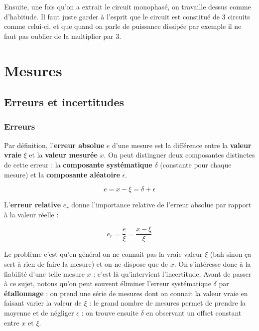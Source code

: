 Ensuite, une fois qu'on a extrait le circuit monophasé, on travaille dessus comme d'habitude. Il faut juste garder à l'esprit que le circuit est constitué de 3 circuits comme celui-ci, et que quand on parle de puissance dissipée par exemple il ne faut pas oublier de la multiplier par 3.


\section{Mesures}
\subsection{Erreurs et incertitudes}
\subsubsection*{Erreurs}
Par définition, l'\textbf{erreur absolue} $e$ d'une mesure est la différence entre la \textbf{valeur vraie} $\xi$ et la \textbf{valeur mesurée} $x$. On peut distinguer deux composantes distinctes de cette erreur : la \textbf{composante systématique} $\delta$ (constante pour chaque mesure) et la \textbf{composante aléatoire} $\epsilon$.

\begin{equation}
e = x - \xi = \delta + \epsilon
\end{equation}

L'\textbf{erreur relative} $e_r$ donne l'importance relative de l'erreur absolue par rapport à la valeur réelle :

\begin{equation}
e_r = \frac{e}{\xi} = \frac{x - \xi}{\xi}
\end{equation}

Le problème c'est qu'en général on ne connait pas la vraie valeur $\xi$ (bah sinon ça sert à rien de faire la mesure) et on ne dispose que de $x$. On s'intéresse donc à la fiabilité d'une telle mesure $x$ : c'est là qu'intervient l'incertitude. Avant de passer à ce sujet, notons qu'on peut souvent éliminer l'erreur systématique $\delta$ par \textbf{étallonnage} : on prend une série de mesures dont on connait la valeur vraie en faisant varier la valeur de $\xi$ : le grand nombre de mesures permet de prendre la moyenne et de négliger $\epsilon$ : on trouve ensuite $\delta$ en observant un offset constant entre $x$ et $\xi$.

